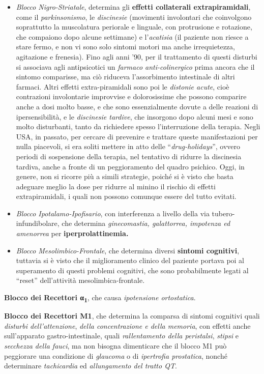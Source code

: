 \documentclass[]{article}
\begin{document}
\begin{itemize}
\item
  \emph{Blocco Nigro-Striatale}, determina gli \textbf{effetti
  collaterali extrapiramidali}, come il \emph{parkinsonismo}, le
  \emph{discinesie} (movimenti involontari che coinvolgono soprattutto
  la muscolatura periorale e linguale, con protrusione e rotazione, che
  compaiono dopo alcune settimane) e l'\emph{acatisia} (il paziente non
  riesce a stare fermo, e non vi sono solo sintomi motori ma anche
  irrequietezza, agitazione e frenesia). Fino agli anni '90, per il
  trattamento di questi disturbi si associava agli antipsicotici un
  \emph{farmaco anti-colinergico} prima ancora che il sintomo
  comparisse, ma ciò riduceva l'assorbimento intestinale di altri
  farmaci. Altri effetti extra-piramidali sono poi le \emph{distonie
  acute}, cioè contrazioni involontarie improvvise e dolorosissime che
  possono comparire anche a dosi molto basse, e che sono essenzialmente
  dovute a delle reazioni di ipersensibilità, e le \emph{discinesie
  tardive}, che insorgono dopo alcuni mesi e sono molto disturbanti,
  tanto da richiedere spesso l'interruzione della terapia. Negli USA, in
  passato, per cercare di prevenire e trattare queste manifestazioni per
  nulla piacevoli, si era soliti mettere in atto delle
  ``\emph{drug-holidays}'', ovvero periodi di sospensione della terapia,
  nel tentativo di ridurre la discinesia tardiva, anche a fronte di un
  peggioramento del quadro psichico. Oggi, in genere, non si ricorre più
  a simili strategie, poiché si è visto che basta adeguare meglio la
  dose per ridurre al minino il rischio di effetti extrapiramidali, i
  quali non possono comunque essere del tutto evitati.
\item
  \emph{Blocco Ipotalamo-Ipofisario}, con interferenza a livello della
  via tubero-infundibolare, che determina \emph{ginecomastia,
  galattorrea, impotenza ed amenorrea} per \textbf{iperprolattinemia.}
\item
  \emph{Blocco Mesolimbico-Frontale}, che determina diversi
  \textbf{sintomi cognitivi}, tuttavia si è visto che il miglioramento
  clinico del paziente portava poi al superamento di questi problemi
  cognitivi, che sono probabilmente legati al ``reset'' dell'attività
  mesolimbica-frontale.
\end{itemize}

\textbf{Blocco dei Recettori α\textsubscript{1}}, che causa
\emph{ipotensione ortostatica}.

\textbf{Blocco dei Recettori M1}, che determina la comparsa di sintomi
cognitivi quali \emph{disturbi dell'attenzione}, \emph{della
concentrazione e della memoria}, con effetti anche sull'apparato
gastro-intestinale, quali \emph{rallentamento della peristalsi},
\emph{stipsi} e \emph{secchezza della fauci}, ma non bisogna dimenticare
che il blocco M1 può peggiorare una condizione di \emph{glaucoma} o di
\emph{ipertrofia prostatica}, nonché determinare \emph{tachicardia} ed
\emph{allungamento del tratto QT}.
\end{document}
